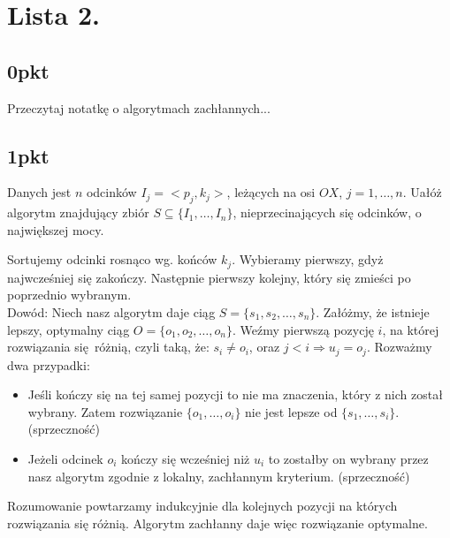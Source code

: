 \documentclass[svgnames]{report}
\begin{document}
%

%

\chapter{}
\chapter{Lista 2.}
\section{0pkt}
\begin{framed}
Przeczytaj notatkę o algorytmach zachłannych...
\end{framed}
\section{1pkt}
\begin{framed}
Danych jest $n$ odcinków $I_j = <p_j,k_j>$, leżących na osi $OX$, $j = 1,\dots,n$. Uałóż algorytm
znajdujący zbiór $S \subseteq \{ I_1,\dots,I_n \}$, nieprzecinających się odcinków, o największej mocy.
\end{framed}

Sortujemy odcinki rosnąco wg. końców $k_j$. Wybieramy pierwszy, gdyż najwcześniej się zakończy. Następnie pierwszy kolejny, który się zmieści po poprzednio wybranym.\\

\noindent Dowód: Niech nasz algorytm daje ciąg $S = \{s_1, s_2, \dots, s_n\}$. Załóżmy, że istnieje lepszy, optymalny ciąg $O = \{o_1,o_2, \dots, o_n\}$. 
Weźmy pierwszą pozycję $i$, na której rozwiązania się różnią, czyli taką, że: $s_i \ne o_i$, oraz $j < i \Rightarrow u_j = o_j$. Rozważmy dwa przypadki:
\begin{itemize}
\item Jeśli kończy się na tej samej pozycji to nie ma znaczenia, który z nich został wybrany. Zatem rozwiązanie $\{o_1,\dots,o_i\}$ nie jest lepsze od $\{s_1,\dots,s_i\}$. (sprzeczność)
\item Jeżeli odcinek $o_i$ kończy się wcześniej niż $u_i$ to zostałby on wybrany przez nasz algorytm zgodnie z lokalny, zachłannym kryterium. (sprzeczność)

\end{itemize}
Rozumowanie powtarzamy indukcyjnie dla kolejnych pozycji na których rozwiązania się różnią. Algorytm zachłanny daje więc rozwiązanie optymalne.
\end{document}

